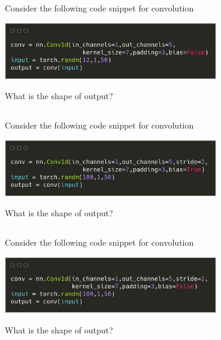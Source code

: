 \begin{frame}
\section{}
Consider the following code snippet for convolution

\includegraphics[width=0.7\textwidth]{images/quiz_4_4_5_4.png}

What is the shape of output?

\end{frame}


\begin{frame}
\section{}
Consider the following code snippet for convolution

\includegraphics[width=0.7\textwidth]{images/quiz_4_4_5_5.png}

What is the shape of output?

\end{frame}


\begin{frame}
\section{}
Consider the following code snippet for convolution

\includegraphics[width=0.7\textwidth]{images/quiz_4_4_5_6.png}

What is the shape of output?

\end{frame}
